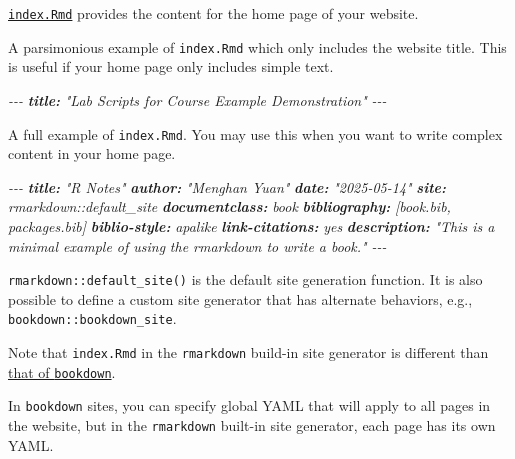 \documentclass[
  a4paper,
  twoside,
  openright]{book}
\newenvironment{Shaded}{\begin{snugshade}}{\end{snugshade}}
\newcommand{\AnnotationTok}[1]{\textcolor[rgb]{0.56,0.35,0.01}{\textbf{\textit{#1}}}}
\newcommand{\CommentTok}[1]{\textcolor[rgb]{0.56,0.35,0.01}{\textit{#1}}}
\theoremstyle{definition}
\theoremstyle{definition}
\theoremstyle{definition}
\theoremstyle{definition}
\theoremstyle{remark}
\begin{document}
\href{https://bookdown.org/yihui/rmarkdown/rmarkdown-site.html\#site-generator-function}{\texttt{index.Rmd}} provides the content for the home page of your website.

A parsimonious example of \texttt{index.Rmd} which only includes the website title. This is useful if your home page only includes simple text.

\begin{Shaded}
\begin{Highlighting}[]
\CommentTok{{-}{-}{-}}
\AnnotationTok{title:}\CommentTok{ "Lab Scripts for Course Example Demonstration"}
\CommentTok{{-}{-}{-}}
\end{Highlighting}
\end{Shaded}

A full example of \texttt{index.Rmd}. You may use this when you want to write complex content in your home page.

\begin{Shaded}
\begin{Highlighting}[]
\CommentTok{{-}{-}{-}}
\AnnotationTok{title:}\CommentTok{ "R Notes"}
\AnnotationTok{author:}\CommentTok{ "Menghan Yuan"}
\AnnotationTok{date:}\CommentTok{ "2025{-}05{-}14"}
\AnnotationTok{site:}\CommentTok{ rmarkdown::default\_site}
\AnnotationTok{documentclass:}\CommentTok{ book}
\AnnotationTok{bibliography:}\CommentTok{ [book.bib, packages.bib]}
\AnnotationTok{biblio{-}style:}\CommentTok{ apalike}
\AnnotationTok{link{-}citations:}\CommentTok{ yes}
\AnnotationTok{description:}\CommentTok{ "This is a minimal example of using}
\CommentTok{  the rmarkdown to write a book."}
\CommentTok{{-}{-}{-}}
\end{Highlighting}
\end{Shaded}

\texttt{rmarkdown::default\_site()} is the default site generation function. It is also possible to define a custom site generator that has alternate behaviors, e.g., \texttt{bookdown::bookdown\_site}.

Note that \texttt{index.Rmd} in the \texttt{rmarkdown} build-in site generator is different than \href{https://bookdown.org/yihui/rmarkdown/bookdown-project.html\#index-file}{that of \texttt{bookdown}}.

In \texttt{bookdown} sites, you can specify global YAML that will apply to all pages in the website, but in the \texttt{rmarkdown} built-in site generator, each page has its own YAML.
\end{document}
